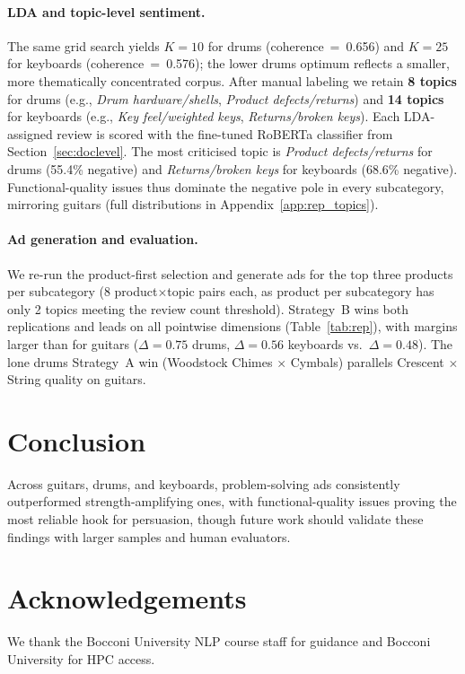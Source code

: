 \documentclass[11pt]{article}
\begin{document}
\paragraph{LDA and topic-level sentiment.}
The same grid search yields $K{=}10$ for drums (coherence~=~0.656)
and $K{=}25$ for keyboards (coherence~=~0.576); the lower drums
optimum reflects a smaller, more thematically concentrated corpus.
After manual labeling we retain \textbf{8 topics} for drums (e.g.,
\textit{Drum hardware/shells}, \textit{Product defects/returns}) and
\textbf{14 topics} for keyboards (e.g., \textit{Key feel/weighted
keys}, \textit{Returns/broken keys}).
Each LDA-assigned review is scored with the fine-tuned RoBERTa
classifier from Section~\ref{sec:doclevel}.
The most criticised topic is \textit{Product defects/returns} for
drums (55.4\% negative) and \textit{Returns/broken keys} for
keyboards (68.6\% negative).
Functional-quality issues thus dominate the negative pole in every
subcategory, mirroring guitars (full distributions in
Appendix~\ref{app:rep_topics}).

\paragraph{Ad generation and evaluation.}
We re-run the product-first selection and generate ads for the top
three products per subcategory (8 product$\times$topic pairs each, as product per subcategory has only 2 topics meeting the review count threshold).
Strategy~B wins both replications and leads on all pointwise
dimensions (Table~\ref{tab:rep}), with margins larger than for
guitars ($\Delta{=}0.75$ drums, $\Delta{=}0.56$ keyboards vs.\
$\Delta{=}0.48$).
The lone drums Strategy~A win (Woodstock Chimes $\times$ Cymbals)
parallels Crescent $\times$ String quality on guitars.

\section{Conclusion}
\label{sec:conclusion}

Across guitars, drums, and keyboards, problem-solving ads consistently outperformed strength-amplifying ones, with functional-quality issues proving the most reliable hook for persuasion, though future work should validate these findings with larger samples and human evaluators.

\section*{Acknowledgements}
We thank the Bocconi University NLP course staff for guidance
and Bocconi University for HPC access.
\end{document}
